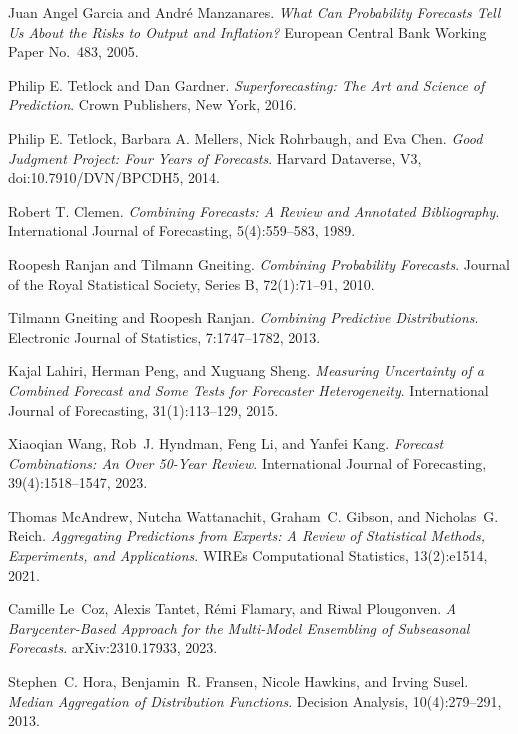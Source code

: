 
Juan Angel Garcia and Andr\'e Manzanares.
\textit{What Can Probability Forecasts Tell Us About the Risks to Output and Inflation?}
European Central Bank Working Paper No.\ 483, 2005.

Philip E. Tetlock and Dan Gardner.
\textit{Superforecasting: The Art and Science of Prediction}.
Crown Publishers, New York, 2016.

Philip E. Tetlock, Barbara A. Mellers, Nick Rohrbaugh, and Eva Chen.
\textit{Good Judgment Project: Four Years of Forecasts}.
Harvard Dataverse, V3, doi:10.7910/DVN/BPCDH5, 2014.

Robert T. Clemen.
\textit{Combining Forecasts: A Review and Annotated Bibliography}.
International Journal of Forecasting, 5(4):559--583, 1989.

Roopesh Ranjan and Tilmann Gneiting.
\textit{Combining Probability Forecasts}.
Journal of the Royal Statistical Society, Series B, 72(1):71--91, 2010.

Tilmann Gneiting and Roopesh Ranjan.
\textit{Combining Predictive Distributions}.
Electronic Journal of Statistics, 7:1747--1782, 2013.

Kajal Lahiri, Herman Peng, and Xuguang Sheng.
\textit{Measuring Uncertainty of a Combined Forecast and Some Tests for Forecaster Heterogeneity}.
International Journal of Forecasting, 31(1):113--129, 2015.

Xiaoqian Wang, Rob~J. Hyndman, Feng Li, and Yanfei Kang.
\textit{Forecast Combinations: An Over 50-Year Review}.
International Journal of Forecasting, 39(4):1518--1547, 2023.

Thomas McAndrew, Nutcha Wattanachit, Graham~C. Gibson, and Nicholas~G. Reich.
\textit{Aggregating Predictions from Experts: A Review of Statistical Methods,
  Experiments, and Applications}.
WIREs Computational Statistics, 13(2):e1514, 2021.

Camille Le~Coz, Alexis Tantet, R{\'e}mi Flamary, and Riwal Plougonven.
\textit{A Barycenter-Based Approach for the Multi-Model Ensembling of
  Subseasonal Forecasts}.
arXiv:2310.17933, 2023.

Stephen~C. Hora, Benjamin~R. Fransen, Nicole Hawkins, and Irving Susel.
\textit{Median Aggregation of Distribution Functions}.
Decision Analysis, 10(4):279--291, 2013.

